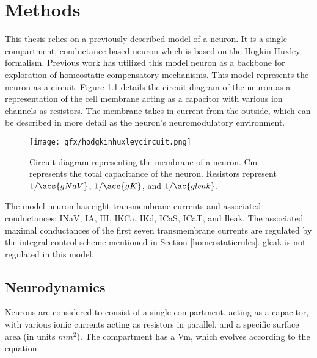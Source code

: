 \chapter{Methods}\label{ch:methods}

This thesis relies on a previously described model of a neuron. It is a single-compartment, conductance-based neuron which is based on the Hogkin-Huxley formalism\cite{hodgkin_components_1952,hodgkin_measurement_1952,hodgkin_quantitative_1952}. Previous work has utilized this model neuron as a backbone for exploration of homeostatic compensatory mechanisms\cite{oleary_correlations_2013,oleary_cell_2014,liu_model_1998}.
This model represents the neuron as a circuit\cite{hodgkin_quantitative_1952}. Figure \ref{fig:hhcircuit} details the circuit diagram of the neuron as a representation of the cell membrane acting as a capacitor with various ion channels as resistors. The membrane takes in current from the outside, which can be described in more detail as the neuron's neuromodulatory environment.

\begin{figure}[h]
    \centering
    \texttt{[image: gfx/hodgkinhuxleycircuit.png]}
    \caption[Circuit diagram representing membrane of a neuron.]{Circuit diagram representing the membrane of a neuron. \ac{Cm} represents the total capacitance of the neuron. Resistors represent \(1/\acs{gNaV}\), \(1/\acs{gK}\), and \(1/\ac{gleak}\)\cite{hodgkin_quantitative_1952}.}
    \label{fig:hhcircuit}
\end{figure}

The model neuron has eight transmembrane currents and associated conductances: \acf{INaV}, \acf{IA}, \acf{IH}, \acf{IKCa}, \acf{IKd}, \acf{ICaS}, \acf{ICaT}, and \acf{Ileak}.
The associated maximal conductances of the first seven transmembrane currents are regulated by the integral control scheme mentioned in Section \ref{homeostaticrules}. \ac{gleak} is not regulated in this model.

\section{Neurodynamics} \label{neurodynamics}

Neurons are considered to consist of a single compartment, acting as a capacitor, with various ionic currents acting as resistors in parallel, and a specific surface area (in units $mm^2$).
The compartment has a \acf{Vm}, which evolves according to the equation:

